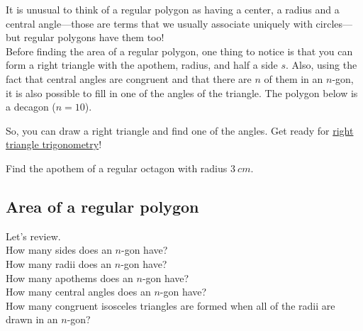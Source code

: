 It is unusual to think of a regular polygon as having a center, a radius and a central angle---those are terms that we usually associate uniquely with circles---but regular polygons have them too!\\

Before finding the area of a regular polygon, one thing to notice is that you can form a right triangle with the apothem, radius, and half a side $s$.
Also, using the fact that central angles are congruent and that there are $n$ of them in an $n$-gon, it is also possible to fill in one of the angles of the triangle.  The polygon below is a decagon ($n=10$).
	\begin{center}
	\end{center}
So, you can draw a right triangle and find one of the angles. 
Get ready for \hyperref[sec:SohCahToa]{right triangle trigonometry}!

\noindent \q Find the apothem of a regular octagon with radius $3~cm$.

\bigskip

\subsection{Area of a regular polygon}

Let's review.\\  
\noindent \q How many sides does an $n$-gon have?\\  
\noindent \q How many radii does an $n$-gon have?\\  
\noindent \q How many apothems does an $n$-gon have?\\  
\noindent \q How many central angles does an $n$-gon have?\\  
\noindent \q How many congruent isosceles triangles are formed when all of the radii are drawn in an $n$-gon?

